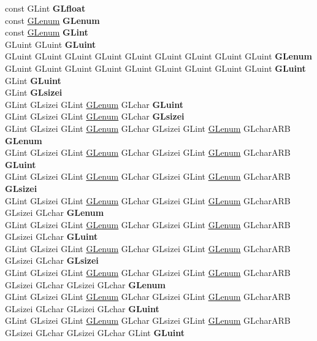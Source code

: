 \begin{DoxyCompactItemize}
\begin{tabbing}
\>const GLint {\bfseries GLfloat}\\
\>const \hyperlink{interfacevoid}{GLenum} {\bfseries GLenum}\\
\>const \hyperlink{interfacevoid}{GLenum} {\bfseries GLint}\\
\>GLuint GLuint {\bfseries GLuint}\\
\>GLuint GLuint GLuint GLuint GLuint GLuint GLuint GLuint GLuint {\bfseries GLenum}\\
\>GLuint GLuint GLuint GLuint GLuint GLuint GLuint GLuint GLuint {\bfseries GLuint}\\
\>GLint {\bfseries GLuint}\\
\>GLint {\bfseries GLsizei}\\
\>GLint GLsizei GLint \hyperlink{interfacevoid}{GLenum} GLchar {\bfseries GLuint}\\
\>GLint GLsizei GLint \hyperlink{interfacevoid}{GLenum} GLchar {\bfseries GLsizei}\\
\>GLint GLsizei GLint \hyperlink{interfacevoid}{GLenum} GLchar GLsizei GLint \hyperlink{interfacevoid}{GLenum} GLcharARB {\bfseries GLenum}\\
\>GLint GLsizei GLint \hyperlink{interfacevoid}{GLenum} GLchar GLsizei GLint \hyperlink{interfacevoid}{GLenum} GLcharARB {\bfseries GLuint}\\
\>GLint GLsizei GLint \hyperlink{interfacevoid}{GLenum} GLchar GLsizei GLint \hyperlink{interfacevoid}{GLenum} GLcharARB {\bfseries GLsizei}\\
\>GLint GLsizei GLint \hyperlink{interfacevoid}{GLenum} GLchar GLsizei GLint \hyperlink{interfacevoid}{GLenum} GLcharARB GLsizei GLchar {\bfseries GLenum}\\
\>GLint GLsizei GLint \hyperlink{interfacevoid}{GLenum} GLchar GLsizei GLint \hyperlink{interfacevoid}{GLenum} GLcharARB GLsizei GLchar {\bfseries GLuint}\\
\>GLint GLsizei GLint \hyperlink{interfacevoid}{GLenum} GLchar GLsizei GLint \hyperlink{interfacevoid}{GLenum} GLcharARB GLsizei GLchar {\bfseries GLsizei}\\
\>GLint GLsizei GLint \hyperlink{interfacevoid}{GLenum} GLchar GLsizei GLint \hyperlink{interfacevoid}{GLenum} GLcharARB GLsizei GLchar GLsizei GLchar {\bfseries GLenum}\\
\>GLint GLsizei GLint \hyperlink{interfacevoid}{GLenum} GLchar GLsizei GLint \hyperlink{interfacevoid}{GLenum} GLcharARB GLsizei GLchar GLsizei GLchar {\bfseries GLuint}\\
\>GLint GLsizei GLint \hyperlink{interfacevoid}{GLenum} GLchar GLsizei GLint \hyperlink{interfacevoid}{GLenum} GLcharARB GLsizei GLchar GLsizei GLchar GLint {\bfseries GLuint}\\

\end{tabbing}
\end{DoxyCompactItemize}
